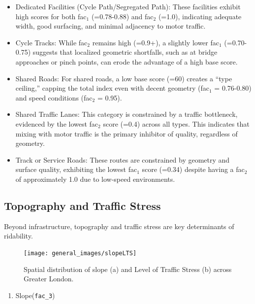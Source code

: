 \documentclass[
  12pt,
  oneside]{book}
\providecommand{\tightlist}{%
  \setlength{\itemsep}{0pt}\setlength{\parskip}{0pt}}
\begin{document}
\begin{itemize}
\item
  Dedicated Facilities (Cycle Path/Segregated Path): These facilities exhibit high scores for both fac\(_1\) (=0.78-0.88) and fac\(_2\) (=1.0), indicating adequate width, good surfacing, and minimal adjacency to motor traffic.
\item
  Cycle Tracks: While fac\(_2\) remains high (=0.9+), a slightly lower fac\(_1\) (=0.70-0.75) suggests that localized geometric shortfalls, such as at bridge approaches or pinch points, can erode the advantage of a high base score.
\item
  Shared Roads: For shared roads, a low base score (=60) creates a ``type ceiling,'' capping the total index even with decent geometry (fac\(_1\) = 0.76-0.80) and speed conditions (fac\(_2\) = 0.95).
\item
  Shared Traffic Lanes: This category is constrained by a traffic bottleneck, evidenced by the lowest fac\(_2\) score (=0.4) across all types. This indicates that mixing with motor traffic is the primary inhibitor of quality, regardless of geometry.
\item
  Track or Service Roads: These routes are constrained by geometry and surface quality, exhibiting the lowest fac\(_1\) score (=0.34) despite having a fac\(_2\) of approximately 1.0 due to low-speed environments.
\end{itemize}

\subsection{Topography and Traffic Stress}\label{topography-and-traffic-stress}

Beyond infrastructure, topography and traffic stress are key determinants of ridability.

\begin{figure}

{\centering \texttt{[image: general\_images/slopeLTS]} 

}

\caption{Spatial distribution of slope (a) and Level of Traffic Stress (b) across Greater London.}\label{fig:slopeLTS}
\end{figure}

\begin{enumerate}
\def\labelenumi{\arabic{enumi}.}
\tightlist
\item
  Slope(\texttt{fac\_3})
\end{enumerate}
\end{document}
